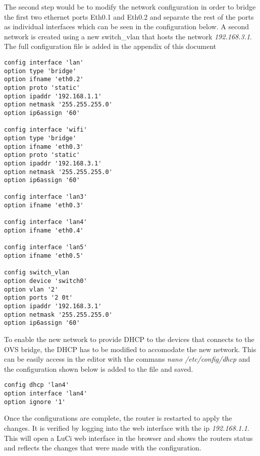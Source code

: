 The second step would be to modify the network configuration in order to bridge the first two ethernet ports Eth0.1 and Eth0.2 and separate the rest of the ports as individual interfaces which can be seen in the configuration below. A second network is created using a new switch\_vlan that hosts the network \textit{192.168.3.1}. The full configuration file is added in the appendix of this document 

\begin{lstlisting}
config interface 'lan'
option type 'bridge'
option ifname 'eth0.2'
option proto 'static'
option ipaddr '192.168.1.1'
option netmask '255.255.255.0'
option ip6assign '60'

config interface 'wifi'
option type 'bridge'
option ifname 'eth0.3'
option proto 'static'
option ipaddr '192.168.3.1'
option netmask '255.255.255.0'
option ip6assign '60'

config interface 'lan3'
option ifname 'eth0.3'

config interface 'lan4'
option ifname 'eth0.4'

config interface 'lan5'
option ifname 'eth0.5'

config switch_vlan
option device 'switch0'
option vlan '2'
option ports '2 0t'
option ipaddr '192.168.3.1'
option netmask '255.255.255.0'
option ip6assign '60'

\end{lstlisting}

To enable the new network to provide DHCP to the devices that connects to the OVS bridge, the DHCP has to be modified to accomodate the new network. This can be easily access in the editor with the commans \textit{nano /etc/config/dhcp} and the configuration shown below  is added to the file and saved.

\begin{lstlisting}
config dhcp 'lan4'
option interface 'lan4'
option ignore '1'
\end{lstlisting}

Once the configurations are complete, the router is restarted to apply the changes. It is verified by logging into the web interface with the ip \textit{192.168.1.1}. This will open a LuCi web interface in the browser and shows the routers status and reflects the changes that were made with the configuration.

